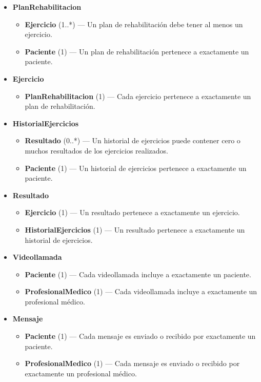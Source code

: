 \documentclass{article}
\begin{document}
\begin{itemize}
	\item \textbf{PlanRehabilitacion}
	\begin{itemize}
		\item \textbf{Ejercicio} (1..*) — Un plan de rehabilitación debe tener al menos un ejercicio.
		\item \textbf{Paciente} (1) — Un plan de rehabilitación pertenece a exactamente un paciente.
	\end{itemize}
	
	\item \textbf{Ejercicio}
	\begin{itemize}
		\item \textbf{PlanRehabilitacion} (1) — Cada ejercicio pertenece a exactamente un plan de rehabilitación.
	\end{itemize}
	
	\item \textbf{HistorialEjercicios}
	\begin{itemize}
		\item \textbf{Resultado} (0..*) — Un historial de ejercicios puede contener cero o muchos resultados de los ejercicios realizados.
		\item \textbf{Paciente} (1) — Un historial de ejercicios pertenece a exactamente un paciente.
	\end{itemize}
	
	\item \textbf{Resultado}
	\begin{itemize}
		\item \textbf{Ejercicio} (1) — Un resultado pertenece a exactamente un ejercicio.
		\item \textbf{HistorialEjercicios} (1) — Un resultado pertenece a exactamente un historial de ejercicios.
	\end{itemize}
	
	\item \textbf{Videollamada}
	\begin{itemize}
		\item \textbf{Paciente} (1) — Cada videollamada incluye a exactamente un paciente.
		\item \textbf{ProfesionalMedico} (1) — Cada videollamada incluye a exactamente un profesional médico.
	\end{itemize}
	
	\item \textbf{Mensaje}
	\begin{itemize}
		\item \textbf{Paciente} (1) — Cada mensaje es enviado o recibido por exactamente un paciente.
		\item \textbf{ProfesionalMedico} (1) — Cada mensaje es enviado o recibido por exactamente un profesional médico.
	\end{itemize}
	

\end{itemize}
\end{document}
